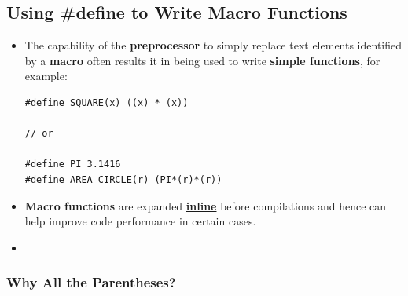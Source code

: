 \documentclass[10pt]{article}
\begin{document}
\subsection{Using \#define to Write Macro Functions}
\begin{itemize}
	\item The capability of the \textbf{preprocessor} to simply replace text elements identified by a \textbf{macro} often results it in being used to write \textbf{simple functions}, for example:

		\begin{verbatim}
#define SQUARE(x) ((x) * (x))

// or 

#define PI 3.1416
#define AREA_CIRCLE(r) (PI*(r)*(r))
		\end{verbatim}

	\item \textbf{Macro functions} are expanded \textbf{\underline{inline}} before compilations and hence can help improve code performance in certain cases.

\item {}
\end{itemize}

\newpage
\subsubsection{Why All the Parentheses?}
\end{document}
